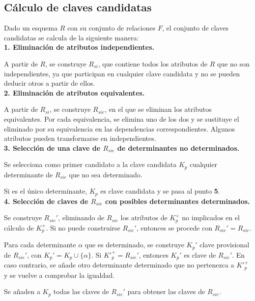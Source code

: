 \documentclass[12pt,a4paper]{article}
\theoremstyle{ejemplo}
\theoremstyle{algoritmo}
\begin{document}
\subsection*{Cálculo de claves candidatas}
Dado un esquema $R$ con su conjunto de relaciones $F$, el conjunto de claves
candidatas se calcula de la siguiente manera:
\\

\textbf{1. Eliminación de atributos independientes.}

A partir de $R$, se construye $R_{si}$, que contiene todos los atributos de $R$
que no son independientes, ya que participan en cualquier clave candidata y no
se pueden deducir otros a partir de ellos.
\\

\textbf{2. Eliminación de atributos equivalentes.}

A partir de $R_{si}$, se construye $R_{sie}$, en el que se eliminan los 
atributos equivalentes. Por cada equivalencia, se elimina uno de los dos y se
sustituye el eliminado por su equivalencia en las dependencias correspondientes.
Algunos atributos pueden transformarse en independientes.
\\

\textbf{3. Selección de una clave de $R_{sie}$ de determinantes no 
determinados.}

Se selecciona como primer candidato a la clave candidata $K_p$ cualquier
determinante de $R_{sie}$ que no sea determinado.

Si es el único determinante, $K_p$ es clave candidata y se pasa al punto 
\textbf{5}.
\\

\textbf{4. Selección de claves de $R_{sie}$ con posibles determinantes  
determinados.}

Se construye $R_{sie}'$, eliminando de $R_{sie}$ los atributos de $K_p^+$ no
implicados en el cálculo de $K_p^+$. Si no puede construirse $R_{sie}'$, 
entonces se procede con $R_{sie}'=R_{sie}$.

Para cada determinante $\alpha$ que es determinado, se construye $K_p'$ clave provisional de $R_{sie}'$, con $K_p'=K_p\cup\{\alpha\}$. Si ${K'}_{p}^{+}=
R_{sie}'$, entonces $K_p'$ es clave de $R_{sie}'$. En caso contrario, se añade
otro determinante determinado que no pertenezca a ${K'}_{p}^{+}$ y se vuelve 
a comprobar la igualdad.

Se añaden a $K_p$ todas las claves de $R_{sie}'$ para obtener las claves de 
$R_{sie}$.
\\
\end{document}
